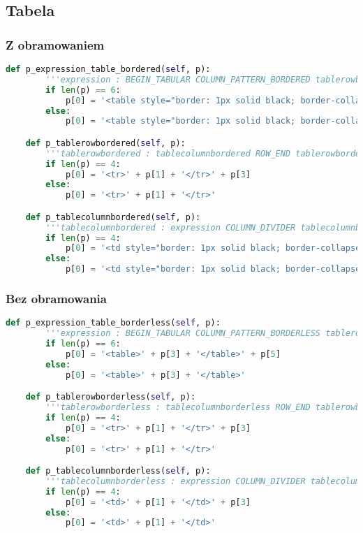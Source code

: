 \subsection{Tabela}

\subsubsection{Z obramowaniem}

\begin{lstlisting}[language={Python}, caption={Gramatyka - tabela}, label={gramatyka-tekst}]
    def p_expression_table_bordered(self, p):
        '''expression : BEGIN_TABULAR COLUMN_PATTERN_BORDERED tablerowbordered END_TABULAR expression | BEGIN_TABULAR COLUMN_PATTERN_BORDERED tablerowbordered END_TABULAR'''
        if len(p) == 6:
            p[0] = '<table style="border: 1px solid black; border-collapse: collapse;">' + p[3] + '</table>' + p[5]
        else:
            p[0] = '<table style="border: 1px solid black; border-collapse: collapse;">' + p[3] + '</table>'

    def p_tablerowbordered(self, p):
        '''tablerowbordered : tablecolumnbordered ROW_END tablerowbordered | tablecolumnbordered'''
        if len(p) == 4:
            p[0] = '<tr>' + p[1] + '</tr>' + p[3]
        else:
            p[0] = '<tr>' + p[1] + '</tr>'

    def p_tablecolumnbordered(self, p):
        '''tablecolumnbordered : expression COLUMN_DIVIDER tablecolumnbordered | expression'''
        if len(p) == 4:
            p[0] = '<td style="border: 1px solid black; border-collapse: collapse;">' + p[1] + '</td>' + p[3]
        else:
            p[0] = '<td style="border: 1px solid black; border-collapse: collapse;">' + p[1] + '</td>'
\end{lstlisting}

\subsubsection{Bez obramowania}

\begin{lstlisting}[language={Python}, caption={Gramatyka - tabela}, label={gramatyka-tekst} ]
    def p_expression_table_borderless(self, p):
        '''expression : BEGIN_TABULAR COLUMN_PATTERN_BORDERLESS tablerowborderless END_TABULAR expression | BEGIN_TABULAR COLUMN_PATTERN_BORDERLESS tablerowborderless END_TABULAR'''
        if len(p) == 6:
            p[0] = '<table>' + p[3] + '</table>' + p[5]
        else:
            p[0] = '<table>' + p[3] + '</table>'

    def p_tablerowborderless(self, p):
        '''tablerowborderless : tablecolumnborderless ROW_END tablerowborderless | tablecolumnborderless'''
        if len(p) == 4:
            p[0] = '<tr>' + p[1] + '</tr>' + p[3]
        else:
            p[0] = '<tr>' + p[1] + '</tr>'

    def p_tablecolumnborderless(self, p):
        '''tablecolumnborderless : expression COLUMN_DIVIDER tablecolumnborderless | expression'''
        if len(p) == 4:
            p[0] = '<td>' + p[1] + '</td>' + p[3]
        else:
            p[0] = '<td>' + p[1] + '</td>'
\end{lstlisting}